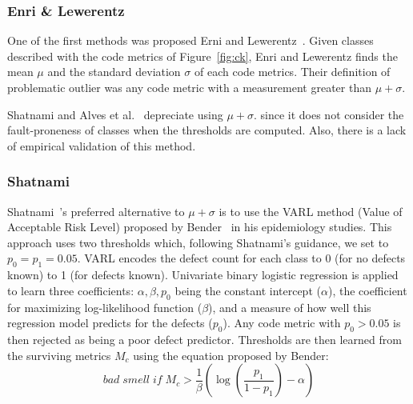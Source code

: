 \documentclass{sig-alternate}
\newcommand{\fig}[1]{Figure~\ref{fig:#1}}
\begin{document}
\subsubsection{Enri \& Lewerentz}
One of the first methods was proposed Erni and Lewerentz~\cite{erni96}. 
Given classes described with the  code metrics of \fig{ck},
Enri and Lewerentz finds the   mean $\mu$ and the standard deviation $\sigma$
of each
code metrics. Their definition of problematic outlier was any code
metric with a measurement greater than $\mu+\sigma$.

Shatnami and Alves et al.~\cite{Shatnawi10,Alves2010} depreciate
using $\mu+\sigma$. since it does not   consider the fault-proneness of classes when the thresholds are computed. Also, there is a lack of empirical validation of this method. 

\subsubsection{ Shatnami}
Shatnami~\cite{Shatnawi10}'s preferred alternative to $\mu+\sigma$
is to use the VARL method (Value of Acceptable Risk Level) proposed by Bender~\cite{bender99} in his epidemiology studies.  This approach uses two
thresholds which, following Shatnami's guidance, we set to
$p_0=p_1=0.05$. VARL encodes the defect count
for each class to 0 (for no defects known) to 1 (for defects known).
Univariate binary logistic regression is applied to learn three coefficients: $\alpha, \beta,p_0$ being
the  constant intercept ($\alpha$), the coefficient for maximizing log-likelihood function ($\beta$),
and a measure of how well this regression model predicts for the defects ($p_0$).
Any code metric with $p_0>0.05$ is then rejected as being a poor defect predictor. Thresholds are then learned from the surviving metrics $M_c$ using
the equation proposed by Bender:
\begin{equation}
 \mathit{bad\; smell\; if\;} M_c > \frac{1}{\beta }\left( {\log \left( {\frac{{{p_1}}}{{1 - {p_1}}}} \right) - \alpha } \right) 
\end{equation}
\end{document}
